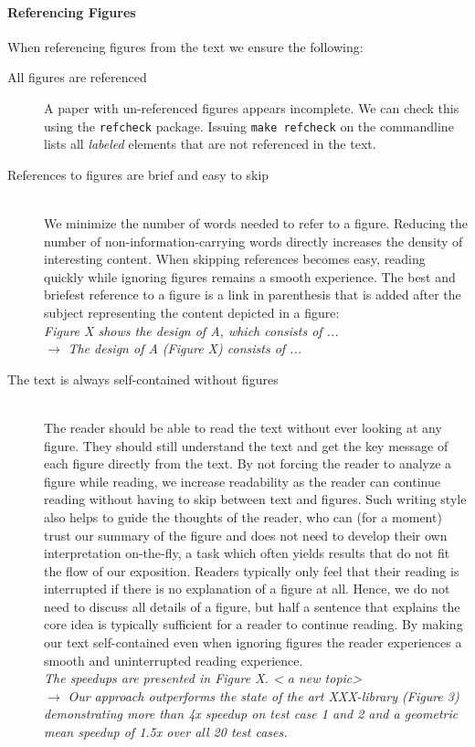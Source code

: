 \documentclass[review, anonymous, acmsmall, screen]{acmart}
\newenvironment{draftonly}{}{}
\begin{document}
\begin{draftonly}
\paragraph{Referencing Figures} When referencing figures from the text we
ensure the following:
\begin{description}
      \item [All figures are referenced] A paper with un-referenced figures appears incomplete.
        We can check this using the \texttt{refcheck} package.
        Issuing \texttt{make refcheck} on the commandline lists all \emph{labeled} elements that are not referenced in the text.
      \item [References to figures are brief and easy to skip]~\\
                We minimize the number of words needed to refer to a figure. Reducing
                the number of non-information-carrying words directly increases
		the density of interesting content. When skipping references
		becomes easy, reading quickly while ignoring figures remains a
		smooth experience. The best and briefest reference to a figure
		is a link in parenthesis that is added after the subject
		representing the content depicted in a figure:\\
		{\color{pairedTwoDarkBlue}\textit{Figure
		X shows the design of A, which consists of ...}}\\
		$\to$ {\color{pairedFourDarkGreen}
		\textit{The design of A (Figure X) consists of ...}}
      \item [The text is always self-contained without figures] ~\\ The reader
                should be able to read the text without ever looking at any
                figure. They should still understand the text and get the key
		message of each figure directly from the text. By not forcing
		the reader to analyze a figure while reading, we increase
		readability as the reader can continue reading without having
		to skip between text and figures. Such writing style also helps
		to guide the thoughts of the reader, who can (for a moment)
		trust our summary of the figure and does not need to develop
		their own interpretation on-the-fly, a task which often yields
		results that do not fit the flow of our exposition. Readers
		typically only feel that their reading is interrupted if there
		is no explanation of a figure at all. Hence, we do not need to
		discuss all details of a figure, but half a sentence that explains the
		core idea is typically sufficient for a reader to continue
		reading.  By making
		our text self-contained even when ignoring figures the reader
		experiences a smooth and uninterrupted reading experience.\\
		{\color{pairedTwoDarkBlue}
		\textit{The speedups are presented in Figure X. < a new topic> }}\\
		$\to$ {\color{pairedFourDarkGreen}\textit{Our approach outperforms the state of the art
		XXX-library (Figure 3) demonstrating more than 4x speedup on
		test case 1 and 2 and a geometric mean speedup of 1.5x over all
		20 test cases.}}
\end{description}


\end{draftonly}
\end{document}
